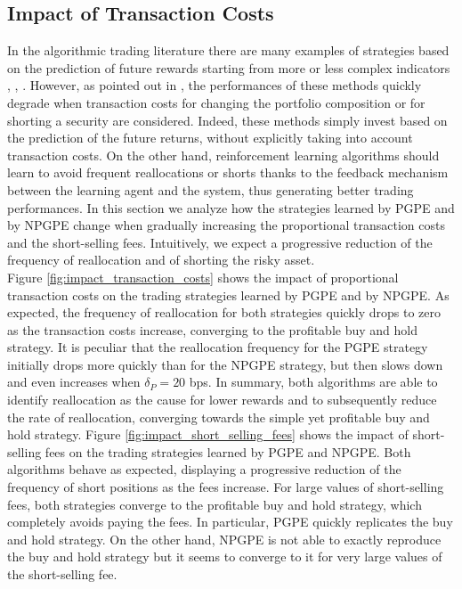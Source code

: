 \subsection{Impact of Transaction Costs}
In the algorithmic trading literature there are many examples of strategies based on the prediction of future rewards starting from more or less complex indicators \cite{kamijo1990stock}, \cite{saad1998comparative}, \cite{liang2011stock}. However, as pointed out in \cite{deng2016deep}, the performances of these methods quickly degrade when transaction costs for changing the portfolio composition or for shorting a security
are considered. Indeed, these methods simply invest based on the prediction of the future returns, without explicitly taking into account transaction costs. On the other hand, reinforcement learning algorithms should learn to avoid frequent reallocations or shorts thanks to the feedback mechanism between the learning agent and the system, thus generating better trading performances. In this section we analyze how the strategies learned by PGPE and by NPGPE change when gradually increasing the proportional transaction costs and the short-selling fees. Intuitively, we expect a progressive reduction of the frequency of reallocation and of shorting the risky asset.\\
Figure \ref{fig:impact_transaction_costs} shows the impact of proportional transaction costs on the trading strategies learned by PGPE and by NPGPE. As expected, the frequency of reallocation for both strategies quickly drops to zero as the transaction costs increase, converging to the profitable buy and hold strategy. It is peculiar that the reallocation frequency for the PGPE strategy initially drops more quickly than for the NPGPE strategy, but then slows down and even increases when $\delta_P = 20$ bps.
In summary, both algorithms are able to identify reallocation as the cause for lower rewards and to subsequently reduce the rate of reallocation, converging towards the simple yet profitable buy and hold strategy. Figure \ref{fig:impact_short_selling_fees} shows the impact of short-selling fees on the trading strategies learned by PGPE and NPGPE. Both algorithms behave as expected, displaying a progressive reduction of the frequency of short positions as the fees increase. For large values of short-selling fees, both strategies converge to the profitable buy and hold strategy, which completely avoids paying the fees. In particular, PGPE quickly replicates the buy and hold strategy. On the other hand, NPGPE is not able to exactly reproduce the buy and hold strategy but it seems to converge to it for very large values of the short-selling fee. 

